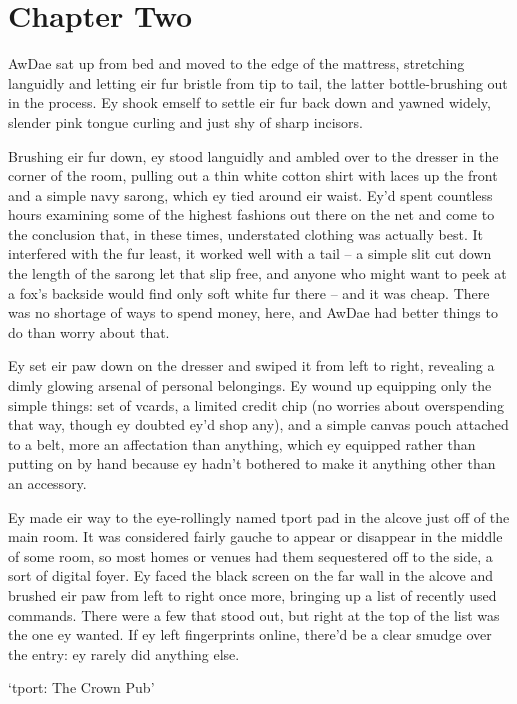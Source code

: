 \chapter*{Chapter Two}

AwDae sat up from bed and moved to the edge of the mattress, stretching languidly and letting eir fur bristle from tip to tail, the latter bottle-brushing out in the process.  Ey shook emself to settle eir fur back down and yawned widely, slender pink tongue curling and just shy of sharp incisors.

Brushing eir fur down, ey stood languidly and ambled over to the dresser in the corner of the room, pulling out a thin white cotton shirt with laces up the front and a simple navy sarong, which ey tied around eir waist.  Ey'd spent countless hours examining some of the highest fashions out there on the net and come to the conclusion that, in these times, understated clothing was actually best.  It interfered with the fur least, it worked well with a tail -- a simple slit cut down the length of the sarong let that slip free, and anyone who might want to peek at a fox's backside would find only soft white fur there -- and it was cheap.  There was no shortage of ways to spend money, here, and AwDae had better things to do than worry about that.

Ey set eir paw down on the dresser and swiped it from left to right, revealing a dimly glowing arsenal of personal belongings.  Ey wound up equipping only the simple things: set of vcards, a limited credit chip (no worries about overspending that way, though ey doubted ey'd shop any), and a simple canvas pouch attached to a belt, more an affectation than anything, which ey equipped rather than putting on by hand because ey hadn't bothered to make it anything other than an accessory.

Ey made eir way to the eye-rollingly named tport pad in the alcove just off of the main room.  It was considered fairly gauche to appear or disappear in the middle of some room, so most homes or venues had them sequestered off to the side, a sort of digital foyer.  Ey faced the black screen on the far wall in the alcove and brushed eir paw from left to right once more, bringing up a list of recently used commands.  There were a few that stood out, but right at the top of the list was the one ey wanted.  If ey left fingerprints online, there'd be a clear smudge over the entry: ey rarely did anything else.

`tport: The Crown Pub'

